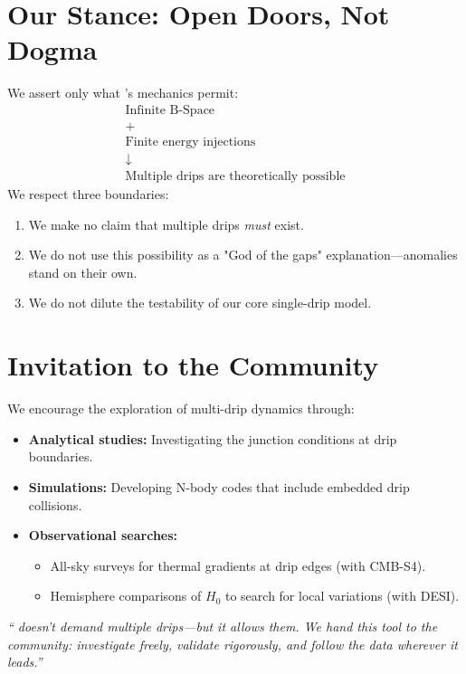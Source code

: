 \documentclass{BSpacePaper} %
\begin{document}
\section{Our Stance: Open Doors, Not Dogma}
We assert only what \bspace{}’s mechanics permit:
\[
\begin{array}{c}
\text{Infinite B-Space} \\
+ \\
\text{Finite energy injections} \\
\downarrow \\
\text{Multiple drips are theoretically possible}
\end{array}
\]
We respect three boundaries:
\begin{enumerate}
    \item We make no claim that multiple drips \textit{must} exist.
    \item We do not use this possibility as a "God of the gaps" explanation—anomalies stand on their own.
    \item We do not dilute the testability of our core single-drip model.
\end{enumerate}

\section{Invitation to the Community}
We encourage the exploration of multi-drip dynamics through:
\begin{itemize}
    \item \textbf{Analytical studies:} Investigating the junction conditions at drip boundaries.
    \item \textbf{Simulations:} Developing N-body codes that include embedded drip collisions.
    \item \textbf{Observational searches:}
    \begin{itemize}
        \item All-sky surveys for thermal gradients at drip edges (with CMB-S4).
        \item Hemisphere comparisons of \(H_0\) to search for local variations (with DESI).
    \end{itemize}
\end{itemize}
\begin{center}
    \textit{``\bspace{} doesn’t demand multiple drips—but it allows them. We hand this tool to the community: investigate freely, validate rigorously, and follow the data wherever it leads.''}
\end{center}
\end{document}
